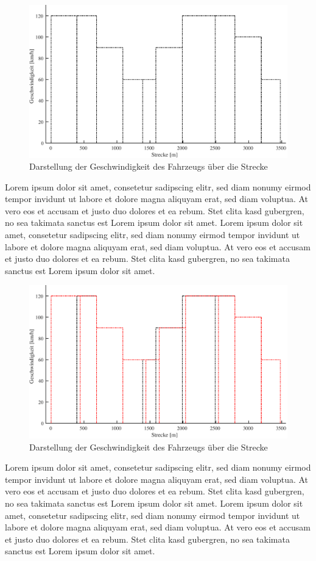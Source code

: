 \begin{figure}[H]
  \includegraphics[width=\linewidth]{../matlab/it_0_1.pdf}
  \caption{Darstellung der Geschwindigkeit des Fahrzeugs über die Strecke}
\end{figure}
Lorem ipsum dolor sit amet, consetetur sadipscing elitr, sed diam nonumy eirmod tempor invidunt ut labore et dolore magna aliquyam erat, sed diam voluptua. At vero eos et accusam et justo duo dolores et ea rebum. Stet clita kasd gubergren, no sea takimata sanctus est Lorem ipsum dolor sit amet. Lorem ipsum dolor sit amet, consetetur sadipscing elitr, sed diam nonumy eirmod tempor invidunt ut labore et dolore magna aliquyam erat, sed diam voluptua. At vero eos et accusam et justo duo dolores et ea rebum. Stet clita kasd gubergren, no sea takimata sanctus est Lorem ipsum dolor sit amet.
\begin{figure}[H]
  \includegraphics[width=\linewidth]{../matlab/it_0_2.pdf}
  \caption{Darstellung der Geschwindigkeit des Fahrzeugs über die Strecke}
\end{figure}
Lorem ipsum dolor sit amet, consetetur sadipscing elitr, sed diam nonumy eirmod tempor invidunt ut labore et dolore magna aliquyam erat, sed diam voluptua. At vero eos et accusam et justo duo dolores et ea rebum. Stet clita kasd gubergren, no sea takimata sanctus est Lorem ipsum dolor sit amet. Lorem ipsum dolor sit amet, consetetur sadipscing elitr, sed diam nonumy eirmod tempor invidunt ut labore et dolore magna aliquyam erat, sed diam voluptua. At vero eos et accusam et justo duo dolores et ea rebum. Stet clita kasd gubergren, no sea takimata sanctus est Lorem ipsum dolor sit amet.
